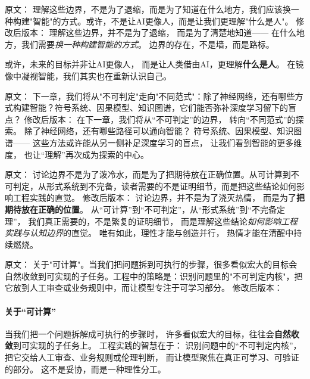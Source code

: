 原文：
理解这些边界，不是为了退缩，而是为了知道在什么地方，我们应该换一种构建"智能"的方式。或许，不是让AI更像人，而是让我们更理解"什么是人"。
修改后版本：
理解这些边界，并不是为了退缩，  
而是为了清楚地知道——  
在什么地方，我们需要\textit{换一种构建智能的方式}。  
边界的存在，不是墙，而是路标。  

或许，未来的目标并非让AI更像人，  
而是让人类借由AI，更理解\textbf{什么是人}。  
在镜像中凝视智能，我们其实也在重新认识自己。



原文：
下一章，我们将从"不可判定"走向"不同范式"：除了神经网络，还有哪些方式构建智能？符号系统、因果模型、知识图谱，它们能否弥补深度学习留下的盲点？
修改后版本：
在下一章，我们将从“不可判定”的边界，  
转向“不同范式”的探索。  
除了神经网络，还有哪些路径可以通向智能？  
符号系统、因果模型、知识图谱——  
这些方法或许能从另一侧补足深度学习的盲点，  
让我们看到智能的更多维度，  
也让“理解”再次成为探索的中心。

\newpage

原文：
讨论边界不是为了泼冷水，而是为了把期待放在正确位置。从可计算到不可判定，从形式系统到不完备，读者需要的不是证明细节，而是把这些结论如何影响工程实践的直觉。
修改后版本：
讨论边界，并不是为了浇灭热情，  
而是为了\textbf{把期待放在正确的位置}。  
从“可计算”到“不可判定”，从“形式系统”到“不完备定理”，  
我们真正需要的，不是繁复的证明细节，  
而是理解这些结论\textit{如何影响工程实践与认知边界}的直觉。  
唯有如此，理性才能与创造并行，  
热情才能在清醒中持续燃烧。



原文：
关于"可计算"。当我们把问题拆到可执行的步骤，很多看似宏大的目标会自然收敛到可实现的子任务。工程中的策略是：识别问题里的"不可判定内核"，把它放到人工审查或业务规则中，而让模型专注于可学习部分。
修改后版本：
\paragraph{关于“可计算”}
当我们把一个问题拆解成可执行的步骤时，  
许多看似宏大的目标，往往会\textbf{自然收敛}到可实现的子任务上。  
工程实践的智慧在于：  
识别问题中的“不可判定内核”，  
把它交给人工审查、业务规则或伦理判断，  
而让模型聚焦在真正可学习、可验证的部分。  
这不是妥协，而是一种理性分工。



